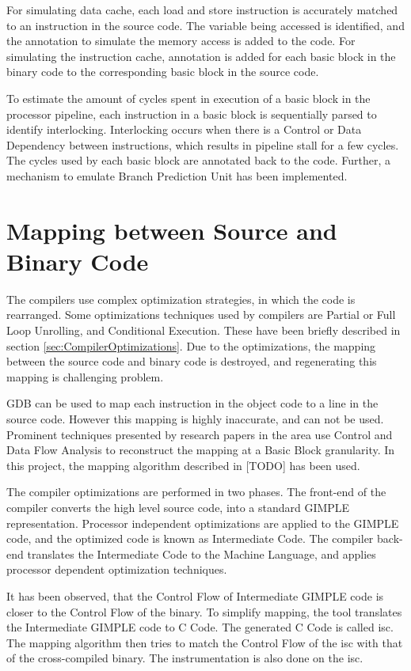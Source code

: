 For simulating data cache, each load and store instruction is accurately matched to an instruction in the source code. The variable being accessed is identified, and the annotation to simulate the memory access is added to the code. For simulating the instruction cache, annotation is added for each basic block in the binary code to the corresponding basic block in the source code.

To estimate the amount of cycles spent in execution of a basic block in the processor pipeline, each instruction in a basic block is sequentially parsed to identify interlocking. Interlocking occurs when there is a Control or Data Dependency between instructions, which results in pipeline stall for a few cycles. The cycles used by each basic block are annotated back to the code. Further, a mechanism to emulate Branch Prediction Unit has been implemented. 

\section{Mapping between Source and Binary Code}
The compilers use complex optimization strategies, in which the code is rearranged. Some optimizations techniques used by compilers are Partial or Full Loop Unrolling, and Conditional Execution. These have been briefly described in section \ref{sec:CompilerOptimizations}. Due to the optimizations, the mapping between the source code and binary code is destroyed, and regenerating this mapping is challenging problem.

GDB can be used to map each instruction in the object code to a line in the source code. However this mapping is highly inaccurate, and can not be used. Prominent techniques presented by research papers in the area use Control and Data Flow Analysis to reconstruct the mapping at a Basic Block granularity. In this project, the mapping algorithm described in [TODO] has been used.

The compiler optimizations are performed in two phases. The front-end of the compiler converts the high level source code, into a standard GIMPLE representation. Processor independent optimizations are applied to the GIMPLE code, and the optimized code is known as Intermediate Code. The compiler back-end translates the Intermediate Code to the Machine Language, and applies processor dependent optimization techniques.

It has been observed, that the Control Flow of Intermediate GIMPLE code is closer to the Control Flow of the binary. To simplify mapping, the tool translates the Intermediate GIMPLE code to C Code. The generated C Code is called \gls{isc}. The mapping algorithm then tries to match the Control Flow of the \gls{isc} with that of the cross-compiled binary. The instrumentation is also done on the \gls{isc}.

